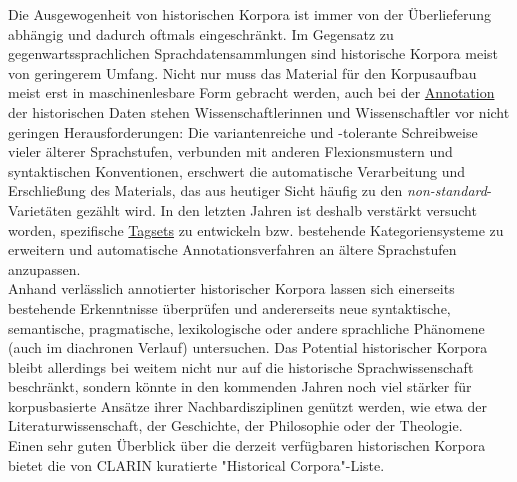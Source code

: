 \documentclass{article}
\begin{document}
        Die Ausgewogenheit von historischen Korpora ist immer von der Überlieferung abhängig und dadurch oftmals eingeschränkt. Im Gegensatz zu gegenwartssprachlichen Sprachdatensammlungen sind historische Korpora meist von geringerem Umfang. Nicht nur muss das Material für den Korpusaufbau meist erst in maschinenlesbare Form gebracht werden, auch bei der \href{http://gams.uni-graz.at/o:konde.17}{Annotation} der historischen Daten stehen Wissenschaftlerinnen und Wissenschaftler vor nicht geringen Herausforderungen: Die variantenreiche und -tolerante Schreibweise vieler älterer Sprachstufen, verbunden mit anderen Flexionsmustern und syntaktischen Konventionen, erschwert die automatische Verarbeitung und Erschließung des Materials, das aus heutiger Sicht häufig zu den \emph{non-standard}-Varietäten gezählt wird. In den letzten Jahren ist deshalb verstärkt versucht worden, spezifische \href{http://gams.uni-graz.at/o:konde.177}{Tagsets} zu entwickeln bzw. bestehende Kategoriensysteme zu erweitern und automatische Annotationsverfahren an ältere Sprachstufen anzupassen.\\
            
        Anhand verlässlich annotierter historischer Korpora lassen sich einerseits bestehende Erkenntnisse überprüfen und andererseits neue syntaktische, semantische, pragmatische, lexikologische oder andere sprachliche Phänomene (auch im diachronen Verlauf) untersuchen. Das Potential historischer Korpora bleibt allerdings bei weitem nicht nur auf die historische Sprachwissenschaft beschränkt, sondern könnte in den kommenden Jahren noch viel stärker für korpusbasierte Ansätze ihrer Nachbardisziplinen genützt werden, wie etwa der Literaturwissenschaft, der Geschichte, der Philosophie oder der Theologie.\\
            
        Einen sehr guten Überblick über die derzeit verfügbaren historischen Korpora bietet die von CLARIN kuratierte "Historical Corpora"-Liste.\\
            
\end{document}
